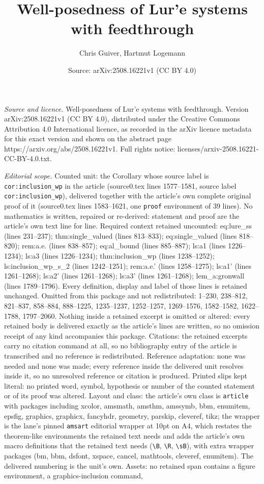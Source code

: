 \documentclass[10pt,a4paper]{amsart}
\title[Well-posedness of Lur'e systems with feedthrough]{Well-posedness of Lur'e systems with feedthrough}
\author{Chris Guiver, Hartmut Logemann}
\date{Source: arXiv:2508.16221v1 (CC BY 4.0)}
\begin{document}
\maketitle

\noindent\emph{Source and licence.} Well-posedness of Lur'e systems with feedthrough. Version arXiv:2508.16221v1 (CC BY 4.0), distributed under the Creative Commons Attribution 4.0 International licence, as recorded in the arXiv licence metadata for this exact version and shown on the abstract page https://arxiv.org/abs/2508.16221v1. Full rights notice: licenses/arxiv-2508.16221-CC-BY-4.0.txt.\par\smallskip

\noindent\textit{Editorial scope.} Counted unit: the Corollary whose source label is \texttt{cor:inclusion\_wp} in the article (source0.tex lines 1577--1581, source label \texttt{cor:inclusion\_wp}), delivered together with the article's own complete original proof of it (source0.tex lines 1583--1621, one \texttt{proof} environment of 39 lines). No mathematics is written, repaired or re-derived: statement and proof are the article's own text line for line. Required context retained uncounted: eq:lure\_ss (lines 231--237); thm:single\_valued (lines 813--833); eq:single\_valued (lines 818--820); rem:a.e. (lines 838--857); eq:al\_bound (lines 885--887); ls:a1 (lines 1226--1234); ls:a3 (lines 1226--1234); thm:inclusion\_wp (lines 1238--1252); ls:inclusion\_wp\_s\_2 (lines 1242--1251); rem:a.e.' (lines 1258--1275); ls:a1' (lines 1261--1268); ls:a2' (lines 1261--1268); ls:a3' (lines 1261--1268); lem\_a:gronwall (lines 1789--1796). Every definition, display and label of those lines is retained unchanged. Omitted from this package and not redistributed: 1--230, 238--812, 821--837, 858--884, 888--1225, 1235--1237, 1252--1257, 1269--1576, 1582--1582, 1622--1788, 1797--2060. Nothing inside a retained excerpt is omitted or altered: every retained body is delivered exactly as the article's lines are written, so no omission receipt of any kind accompanies this package. Citations: the retained excerpts carry no citation command at all, so no bibliography entry of the article is transcribed and no reference is redistributed. Reference adaptation: none was needed and none was made; every reference inside the delivered unit resolves inside it, so no unresolved reference or citation is produced. Printed slips kept literal: no printed word, symbol, hypothesis or number of the counted statement or of its proof was altered. Layout and class: the article's own class is \texttt{article} with packages including xcolor, amsmath, amsthm, amssymb, bbm, enumitem, epsfig, graphics, graphicx, fancyhdr, geometry, parskip, cleveref, tikz; the wrapper is the lane's pinned \texttt{amsart} editorial wrapper at 10pt on A4, which restates the theorem-like environments the retained text needs and adds the article's own macro definitions that the retained text needs (\texttt{\textbackslash B}, \texttt{\textbackslash R}, \texttt{\textbackslash sB}), with extra wrapper packages (bm, bbm, dsfont, xspace, cancel, mathtools, cleveref, enumitem). The delivered numbering is the unit's own. Assets: no retained span contains a figure environment, a graphics-inclusion command, 
\end{document}
